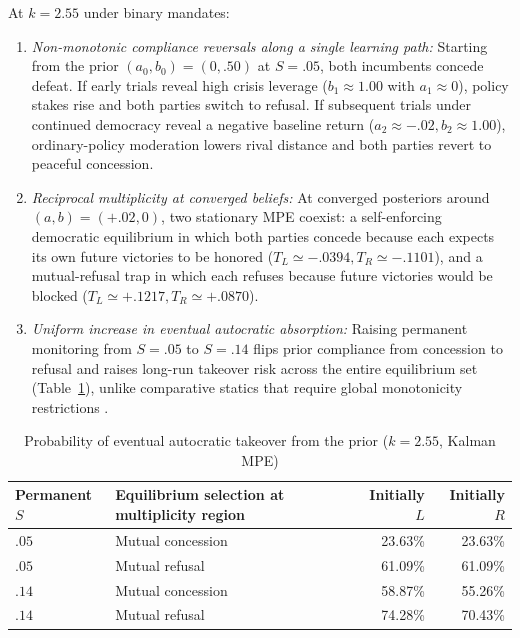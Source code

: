 \begin{result}\label{prop:stationary}
At $k=2.55$ under binary mandates:
\begin{enumerate}
\item \emph{Non-monotonic compliance reversals along a single learning path:} Starting from the prior $(a_0,b_0)=(0,.50)$ at $S=.05$, both incumbents concede defeat. If early trials reveal high crisis leverage ($b_1\approx 1.00$ with $a_1\approx 0$), policy stakes rise and both parties switch to refusal. If subsequent trials under continued democracy reveal a negative baseline return ($a_2\approx -.02,b_2\approx 1.00$), ordinary-policy moderation lowers rival distance and both parties revert to peaceful concession.
\item \emph{Reciprocal multiplicity at converged beliefs:} At converged posteriors around $(a,b)=(+.02,0)$, two stationary MPE coexist: a self-enforcing democratic equilibrium in which both parties concede because each expects its own future victories to be honored ($T_L\simeq -.0394,T_R\simeq -.1101$), and a mutual-refusal trap in which each refuses because future victories would be blocked ($T_L\simeq +.1217,T_R\simeq +.0870$).
\item \emph{Uniform increase in eventual autocratic absorption:} Raising permanent monitoring from $S=.05$ to $S=.14$ flips prior compliance from concession to refusal and raises long-run takeover risk across the entire equilibrium set (Table~\ref{tab:risk}), unlike comparative statics that require global monotonicity restrictions \citep{milgromroberts}.
\end{enumerate}
\end{result}

\begin{table}[htbp]\centering\small
\caption{Probability of eventual autocratic takeover from the prior ($k=2.55$, Kalman MPE)}\label{tab:risk}
\begin{tabular}{@{}llrr@{}}
\toprule
Permanent $S$ & Equilibrium selection at multiplicity region & Initially $L$ & Initially $R$\\ \midrule
$.05$ & Mutual concession & 23.63\% & 23.63\%\\
$.05$ & Mutual refusal    & 61.09\% & 61.09\%\\
$.14$ & Mutual concession & 58.87\% & 55.26\%\\
$.14$ & Mutual refusal    & 74.28\% & 70.43\%\\ \bottomrule
\end{tabular}
\end{table}

